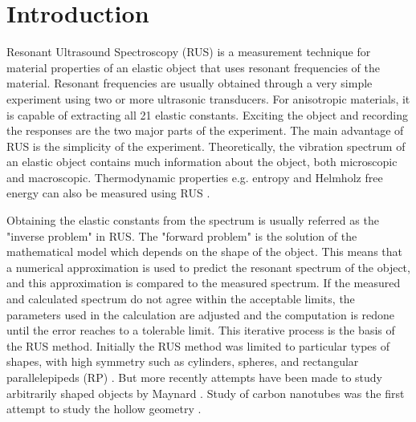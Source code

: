 \section{Introduction}
\begin{doublespacing}
Resonant Ultrasound Spectroscopy (RUS) is a measurement technique for material properties of an elastic object that uses resonant frequencies of the material. Resonant frequencies are usually obtained through a very simple experiment using two or more ultrasonic transducers. For anisotropic materials, it is capable of extracting all 21 elastic constants. Exciting the object and recording the responses are the two major parts of the experiment. The main advantage of RUS is the simplicity of the experiment. Theoretically, the vibration spectrum of an elastic object contains much information about the object, both microscopic and macroscopic. Thermodynamic properties e.g. entropy and Helmholz free energy can also be measured using RUS \cite{rusbook} \cite{anderson1995equations}. 


Obtaining the elastic constants from the spectrum is usually referred as the "inverse problem" in RUS. The "forward problem" is the solution of the mathematical model which depends on the shape of the object. This means that a numerical approximation is used to predict the resonant spectrum of the object, and this approximation is compared to the measured spectrum. If the measured and calculated spectrum do not agree within the acceptable limits, the parameters used in the calculation are adjusted and the computation is redone until the error reaches to a tolerable limit. This iterative process is the basis of the RUS method. Initially the RUS method was limited to particular types of shapes, with high symmetry such as cylinders, spheres, and rectangular parallelepipeds (RP) \cite{litwiller2000resonant}. But more recently attempts have been made to study arbitrarily shaped objects by Maynard \cite{liu2012measuring}. Study of carbon nanotubes was the first attempt to study the hollow geometry \cite{li2008acoustic}.


\end{doublespacing}
